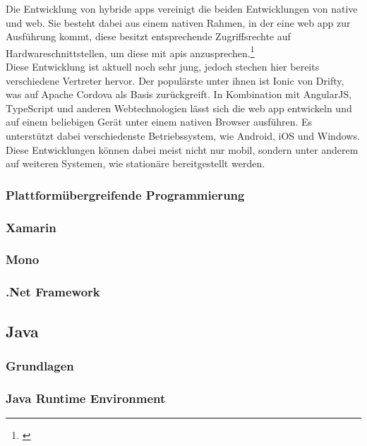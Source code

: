Die Entwicklung von hybride \glspl{app} vereinigt die beiden Entwicklungen von native und web. Sie besteht dabei aus einem nativen Rahmen, in der eine web \gls{app} zur Ausführung kommt, diese besitzt entsprechende Zugriffsrechte auf Hardwareschnittstellen, um diese mit \glspl{api} anzusprechen.\footnote{\citep[vgl.][Native App, Web App und Hybrid App im Überblick]{PetraRiepe.NativeApp}\label{note2}}\\
Diese Entwicklung ist aktuell noch sehr jung, jedoch stechen hier bereits verschiedene Vertreter hervor. Der populärste unter ihnen ist Ionic von Drifty, was auf Apache Cordova als Basis zurückgreift. In Kombination mit AngularJS, TypeScript und anderen Webtechnologien lässt sich die web \gls{app} entwickeln und auf einem beliebigen Gerät unter einem nativen Browser ausführen. Es unterstützt dabei verschiedenste Betriebssystem, wie Android, iOS und Windows. Diese Entwicklungen können dabei meist nicht nur mobil, sondern unter anderem auf weiteren Systemen, wie stationäre bereitgestellt werden.

\subsubsection{Plattformübergreifende Programmierung}

\subsubsection*{Xamarin}
\subsubsection{Mono}
\subsubsection{.Net Framework}

\subsection{Java} %

\subsubsection{Grundlagen}
\subsubsection{Java Runtime Environment}

